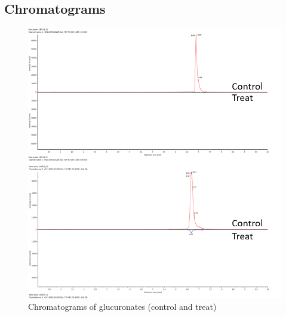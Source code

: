 \subsection{Chromatograms}
\label{chromatograms}
\begin{figure}[h!]
	\centering
	\includegraphics[width=0.7\linewidth]{picture/glucuronate_1}
	\caption{Chromatograms of glucuronates (control and treat) }
	\label{fig:glucuronate1}
\end{figure}
